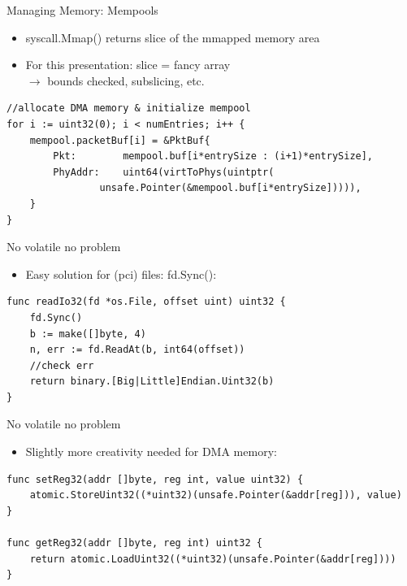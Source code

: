 \documentclass[NET,english,aspectratio=169,notitleframe]{tumbeamer}
\begin{document}
\begin{frame}[fragile]{Managing Memory: Mempools}
\begin{itemize}
\item syscall.Mmap() returns slice of the mmapped memory area
\item For this presentation: slice = fancy array\\
	$\rightarrow$ bounds checked, subslicing, etc.
\end{itemize}

\begin{verbatim}
//allocate DMA memory & initialize mempool
for i := uint32(0); i < numEntries; i++ {
	mempool.packetBuf[i] = &PktBuf{
		Pkt:        mempool.buf[i*entrySize : (i+1)*entrySize],
		PhyAddr:    uint64(virtToPhys(uintptr(
			    unsafe.Pointer(&mempool.buf[i*entrySize])))),
	}
}
\end{verbatim}
\end{frame}

\begin{frame}[fragile]{No volatile no problem}
\begin{itemize}
\item Easy solution for (pci) files: fd.Sync():
\end{itemize}
\begin{verbatim}
func readIo32(fd *os.File, offset uint) uint32 {
	fd.Sync()
	b := make([]byte, 4)
	n, err := fd.ReadAt(b, int64(offset))
	//check err
	return binary.[Big|Little]Endian.Uint32(b)
}
\end{verbatim}
\end{frame}

\begin{frame}[fragile]{No volatile no problem}
\begin{itemize}
\item Slightly more creativity needed for DMA memory:
\end{itemize}
\begin{verbatim}
func setReg32(addr []byte, reg int, value uint32) {
	atomic.StoreUint32((*uint32)(unsafe.Pointer(&addr[reg])), value)
}

func getReg32(addr []byte, reg int) uint32 {
	return atomic.LoadUint32((*uint32)(unsafe.Pointer(&addr[reg])))
}
\end{verbatim}
\end{frame}
\end{document}
